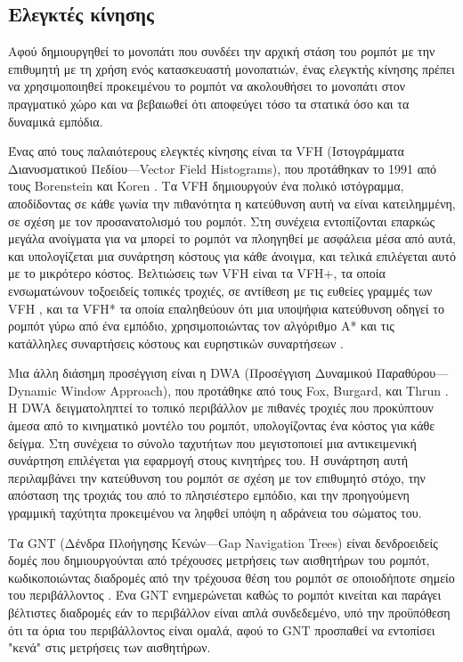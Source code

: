 \subsection{Ελεγκτές κίνησης}

Αφού δημιουργηθεί το μονοπάτι που συνδέει την αρχική στάση του ρομπότ με την
επιθυμητή με τη χρήση ενός κατασκευαστή μονοπατιών, ένας ελεγκτής κίνησης
πρέπει να χρησιμοποιηθεί προκειμένου το ρομπότ να ακολουθήσει το μονοπάτι στον
πραγματικό χώρο και να βεβαιωθεί ότι αποφεύγει τόσο τα στατικά όσο και τα
δυναμικά εμπόδια.

Ένας από τους παλαιότερους ελεγκτές κίνησης είναι τα VFH (Ιστογράμματα
Διανυσματικού Πεδίου---Vector Field Histograms), που προτάθηκαν το 1991 από
τους Borenstein και Koren \cite{Borenstein1991}.  Τα VFH δημιουργούν ένα πολικό
ιστόγραμμα, αποδίδοντας σε κάθε γωνία την πιθανότητα η κατεύθυνση αυτή να είναι
κατειλημμένη, σε σχέση με τον προσανατολισμό του ρομπότ.  Στη συνέχεια
εντοπίζονται επαρκώς μεγάλα ανοίγματα για να μπορεί το ρομπότ να πλοηγηθεί με
ασφάλεια μέσα από αυτά, και υπολογίζεται μια συνάρτηση κόστους για κάθε
άνοιγμα, και τελικά επιλέγεται αυτό με το μικρότερο κόστος.  Βελτιώσεις των VFH
είναι τα VFH+, τα οποία ενσωματώνουν τοξοειδείς τοπικές τροχιές, σε αντίθεση με
τις ευθείες γραμμές των VFH \cite{Ulrich}, και τα VFH* τα οποία επαληθεύουν ότι
μια υποψήφια κατεύθυνση οδηγεί το ρομπότ γύρω από ένα εμπόδιο, χρησιμοποιώντας
τον αλγόριθμο A* και τις κατάλληλες συναρτήσεις κόστους και ευρηστικών
συναρτήσεων \cite{Ulricha}.

Μια άλλη διάσημη προσέγγιση είναι η DWA (Προσέγγιση Δυναμικού
Παραθύρου---Dynamic Window Approach), που προτάθηκε από τους Fox, Burgard, και
Thrun \cite{Fox1997}. Η DWA δειγματοληπτεί το τοπικό περιβάλλον με πιθανές
τροχιές που προκύπτουν άμεσα από το κινηματικό μοντέλο του ρομπότ,
υπολογίζοντας ένα κόστος για κάθε δείγμα. Στη συνέχεια το σύνολο ταχυτήτων που
μεγιστοποιεί μια αντικειμενική συνάρτηση επιλέγεται για εφαρμογή στους
κινητήρες του. Η συνάρτηση αυτή περιλαμβάνει την κατεύθυνση του ρομπότ σε σχέση
με τον επιθυμητό στόχο, την απόσταση της τροχιάς του από το πλησιέστερο
εμπόδιο, και την προηγούμενη γραμμική ταχύτητα προκειμένου να ληφθεί υπόψη η
αδράνεια του σώματος του.

Τα GNT (Δένδρα Πλοήγησης Κενών---Gap Navigation Trees) είναι δενδροειδείς δομές
που δημιουργούνται από τρέχουσες μετρήσεις των αισθητήρων του ρομπότ,
κωδικοποιώντας διαδρομές από την τρέχουσα θέση του ρομπότ σε οποιοδήποτε σημείο
του περιβάλλοντος \cite{Tovar2005}.  Ένα GNT ενημερώνεται καθώς το ρομπότ
κινείται και παράγει βέλτιστες διαδρομές εάν το περιβάλλον είναι απλά
συνδεδεμένο, υπό την προϋπόθεση ότι τα όρια του περιβάλλοντος είναι ομαλά, αφού
το GNT προσπαθεί να εντοπίσει "κενά" στις μετρήσεις των αισθητήρων.

